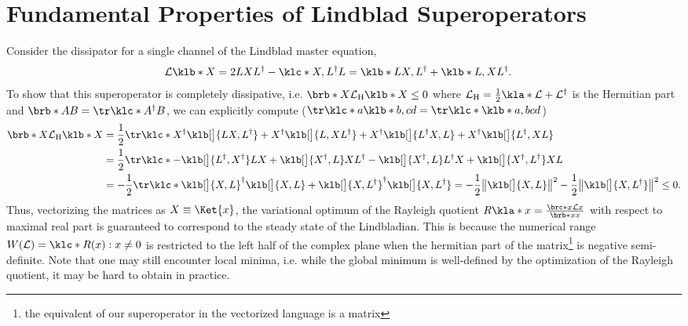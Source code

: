 \documentclass[english, parskip=full]{scrartcl}
\title{\Title}
\author{\Author}
\date{\today}
\begin{document}
\maketitle  %

\section{Fundamental Properties of Lindblad Superoperators}
Consider the dissipator for a single channel of the Lindblad master equation,
\begin{align}
\mathcal{L}\klb*{X} &= 2LXL^\dagger - \klc*{X,L^\dagger L} = \klb*{LX, L^\dagger} + \klb*{L, XL^\dagger}.
\end{align}
To show that this superoperator is completely dissipative, i.e. $\brb*{X}{\mathcal{L}_\text{H}\klb*{X}} \le 0$ where $\mathcal{L}_\text{H} = \frac{1}{2} \kla*{\mathcal{L} + \mathcal{L}^\dagger}$ is the Hermitian part and $\brb*{A}{B} = \tr \klc*{A^\dagger B}$, we can explicitly compute ($\tr\klc*{a\klb*{b,cd}} = \tr\klc*{\klb*{a,b}cd}$)%
\begin{align}
\brb*{X}{\mathcal{L}_\text{H}\klb*{X}} &= \frac{1}{2} \tr\klc*{X^\dagger \klb[\big]{LX, L^\dagger} + X^\dagger \klb[\big]{L, XL^\dagger} + X^\dagger \klb[\big]{L^\dagger X, L} + X^\dagger \klb[\big]{L^\dagger, XL}}\\
&= \frac{1}{2} \tr\klc*{-\klb[\big]{L^\dagger, X^\dagger} LX + \klb[\big]{X^\dagger, L} XL^\dagger - \klb[\big]{X^\dagger, L}L^\dagger X + \klb[\big]{X^\dagger, L^\dagger} XL}\\
&= -\frac{1}{2} \tr\klc*{\klb[\big]{X,L}^\dagger \klb[\big]{X,L} + \klb[\big]{X, L^\dagger}^\dagger \klb[\big]{X, L^\dagger}} = -\frac{1}{2} \bigl\| \klb[\big]{X,L} \bigr\|^2 - \frac{1}{2} \bigl\| \klb[\big]{X,L^\dagger} \bigr\|^2 \le 0.
\end{align}
Thus, vectorizing the matrices as $X\equiv \Ket{x}$, the variational optimum of the Rayleigh quotient $R\kla*{x} = \frac{\brc*{x}{\mathcal{L}}{x}}{\brb*{x}{x}}$ with respect to maximal real part is guaranteed to correspond to the steady state of the Lindbladian.
This is because the numerical range $W(\mathcal{L}) = \klc*{R(x) : x\neq 0}$ is restricted to the left half of the complex plane when the hermitian part of the matrix\footnote{the equivalent of our superoperator in the vectorized language is a matrix} is negative semi-definite.
Note that one may still encounter local minima, i.e. while the global minimum is well-defined by the optimization of the Rayleigh quotient, it may be hard to obtain in practice.
\end{document}
